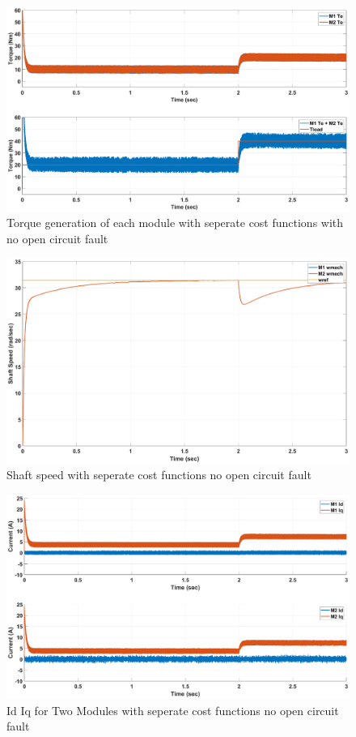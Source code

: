 \documentclass{article}
\begin{document}
\begin{figure}[H]
\centering
\includegraphics[scale=0.3]{Figures/TwoModule/SeperateCost/Torques.eps}
\caption{Torque generation of each module with seperate cost functions with no open circuit fault}
\label{fig:Tload_TwoModuleSeperateCost}
\end{figure}
\begin{figure}[H]
\centering
\includegraphics[scale=0.3]{Figures/TwoModule/SeperateCost/ShaftSpeed.eps}
\caption{Shaft speed with seperate cost functions no open circuit fault}
\label{fig:Wshaft_TwoModuleSeperateCost}
\end{figure}
\begin{figure}[H]
\centering
\includegraphics[scale=0.3]{Figures/TwoModule/SeperateCost/Id_Iq.eps}
\caption{Id Iq for Two Modules with seperate cost functions no open circuit fault}
\label{fig:Current_dq_TwoModuleSeperateCost}
\end{figure}
\end{document}
